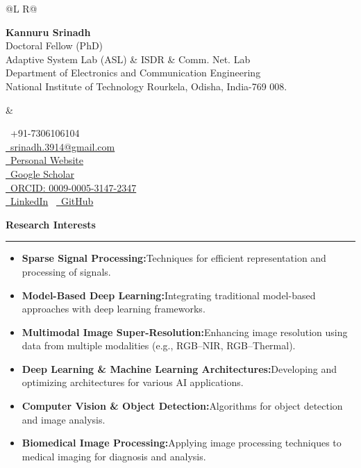 \documentclass[a4paper,11pt]{article}
\makeatletter
\renewcommand{\section}[1]{%
  \vspace{8pt}%
  {\large\scshape\raggedright #1}%
  \vspace{3pt}\hrule\vspace{4pt}%
}
\newcommand{\resumeItem}[2]{
  \item{
    \textbf{#1}{\hspace{0.5mm}#2 \vspace{-0.5mm}}
  }
}
\newcommand{\name}{Kannuru Srinadh}
\newcommand{\phone}{7306106104}
\newcommand{\emaila}{srinadh.3914@gmail.com}
\newcommand{\googlescholarlink}{https://scholar.google.com/citations?user=VQD7sScAAAAJ&hl=en}
\newcommand{\orcidlink}{https://orcid.org/0009-0005-3147-2347}
\newcommand{\linkedinlink}{https://www.linkedin.com/in/kannuru-srinadh-56618a2b3}
\newcommand{\githublink}{https://github.com/kannurusrinadh}
\newcommand{\personalwebsitelink}{https://kannurusrinadh.github.io/}
\makeatother
\begin{document}
\selectfont

\selectfont
{
\begin{tabularx}{\linewidth}{@{}L R@{}}
  \parbox[t]{0.66\textwidth}{%
    \textbf{\Huge \name} \\[2pt]
    Doctoral Fellow (PhD) \\
    Adaptive System Lab (ASL) \& ISDR \& Comm. Net. Lab \\
    Department of Electronics and Communication Engineering \\
    National Institute of Technology Rourkela, Odisha, India-769 008.
  } &
  \parbox[t]{0.32\textwidth}{\raggedleft
    \footnotesize
    \faPhone\ +91-\phone \\
    \href{mailto:\emaila}{\faEnvelope\ \emaila} \\
    \href{\personalwebsitelink}{\faGlobe\ Personal Website} \\
    \href{\googlescholarlink}{\faGraduationCap\ Google Scholar} \\
    \href{\orcidlink}{\faOrcid\ ORCID: 0009-0005-3147-2347} \\
    \href{\linkedinlink}{\faLinkedin\ LinkedIn} \ \href{\githublink}{\faGithub\ GitHub}
  }
\end{tabularx}
}
\vspace{-1mm}

\section{\textbf{Research Interests}}
\begin{itemize}[leftmargin=*,labelsep=1.5mm,topsep=0pt,partopsep=0pt,itemsep=4pt,parsep=0pt]
  \resumeItem{Sparse Signal Processing:}{Techniques for efficient representation and processing of signals.}
  \resumeItem{Model-Based Deep Learning:}{Integrating traditional model-based approaches with deep learning frameworks.}
  \resumeItem{Multimodal Image Super-Resolution:}{Enhancing image resolution using data from multiple modalities (e.g., RGB--NIR, RGB--Thermal).}
  \resumeItem{Deep Learning \& Machine Learning Architectures:}{Developing and optimizing architectures for various AI applications.}
  \resumeItem{Computer Vision \& Object Detection:}{Algorithms for object detection and image analysis.}
  \resumeItem{Biomedical Image Processing:}{Applying image processing techniques to medical imaging for diagnosis and analysis.}
\end{itemize}
\end{document}
